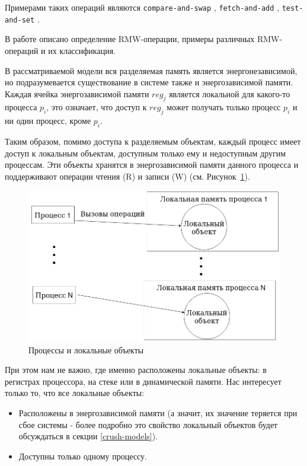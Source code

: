 \documentclass[times,specification,annotation]{itmo-student-thesis}
\begin{document}
\bigbreak

Примерами таких операций являются \texttt{compare-and-swap} \cite{compare-and-swap}, \texttt{fetch-and-add} \cite{fetch-and-add}, \texttt{test-and-set} \cite{test-and-set}.

В работе \cite{herlihy1991wait} описано определение RMW-операции, примеры различных RMW-операций и их классификация.

В рассматриваемой модели вся разделяемая память является энергонезависимой, но подразумевается существование в системе также и энергозависимой памяти. Каждая ячейка энергозависимой памяти $reg_j$ является локальной для какого-то процесса $p_i$, это означает, что доступ к $reg_j$ может получать только процесс $p_i$ и ни один процесс, кроме $p_i$.

Таким образом, помимо доступа к разделяемым объектам, каждый процесс имеет доступ к локальным объектам, доступным только ему и недоступным другим процессам. Эти объекты хранятся в энергозависимой памяти данного процесса и поддерживают операции чтения (R) и записи (W) (см. Рисунок~\ref{model-local-pic}). 

\begin{figure}[H]
  \centering
  \caption{Процессы и локальные объекты}
  \label{model-local-pic}
  \includegraphics[width=\linewidth]{model_local.png}
\end{figure}

\bigbreak

При этом нам не важно, где именно расположены локальные объекты: в регистрах процессора, на стеке или в динамической памяти. Нас интересует только то, что все локальные объекты:

\begin{itemize}
    \item Расположены в энергозависимой памяти (а значит, их значение теряется при сбое системы - более подробно это свойство локальный объектов будет обсуждаться в секции \ref{crush-models}).
    
    \item Доступны только одному процессу.
\end{itemize}
\end{document}
